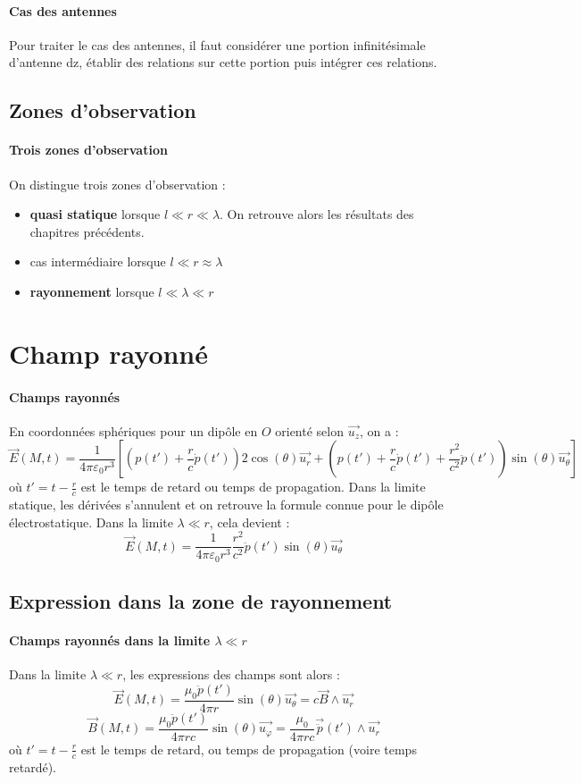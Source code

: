 \documentclass[french]{book}
\theoremstyle{plain}
\theoremstyle{definition}
\theoremstyle{remark}
\begin{document}
\paragraph{Cas des antennes} Pour traiter le cas des antennes, il faut considérer une portion infinitésimale d'antenne dz, établir des relations sur cette portion puis intégrer ces relations.
\subsection{Zones d'observation}
\paragraph{Trois zones d'observation} On distingue trois zones d'observation :
\begin{itemize}
	\item \textbf{quasi statique} lorsque $l\ll r\ll \lambda$. On retrouve alors les résultats des chapitres précédents.
	\item cas intermédiaire lorsque $l\ll r\approx\lambda$
	\item \textbf{rayonnement} lorsque $l\ll\lambda\ll r$
\end{itemize}
\section{Champ rayonné}
\paragraph{Champs rayonnés} En coordonnées sphériques pour un dipôle en $O$ orienté selon $\overrightarrow{u_z}$, on a : $$\overrightarrow{E}(M,t)=\frac{1}{4\pi\varepsilon_0 r^3}\left[\left(p(t')+\frac{r}{c}\dot{p}(t')\right)2\cos(\theta)\overrightarrow{u_r}+\left(p(t')+\frac{r}{c}\dot{p}(t')+\frac{r^2}{c^2}\ddot{p}(t')\right)\sin(\theta)\overrightarrow{u_\theta}\right]$$ où $t'=\displaystyle t-\frac{r}{c}$ est le temps de retard ou temps de propagation. Dans la limite statique, les dérivées s'annulent et on retrouve la formule connue pour le dipôle électrostatique. Dans la limite $\lambda\ll r$, cela devient : $$\overrightarrow{E}(M,t)=\frac{1}{4\pi\varepsilon_0 r^3}\frac{r^2}{c^2}\ddot{p}(t')\sin(\theta)\overrightarrow{u_\theta}$$
\subsection{Expression dans la zone de rayonnement}
\paragraph{Champs rayonnés dans la limite $\lambda\ll r$} Dans la limite $\lambda\ll r$, les expressions des champs sont alors : $$\overrightarrow{E}(M,t)=\frac{\mu_0\ddot{p}(t')}{4\pi r}\sin(\theta)\overrightarrow{u_\theta}=c\overrightarrow{B}\wedge\overrightarrow{u_r}$$ $$\overrightarrow{B}(M,t)=\frac{\mu_0\ddot{p}(t')}{4\pi rc}\sin(\theta)\overrightarrow{u_\varphi}=\frac{\mu_0}{4\pi rc}\overrightarrow{\ddot{p}}(t')\wedge\overrightarrow{u_r}$$ où $\displaystyle t'=t-\frac{r}{c}$ est le temps de retard, ou temps de propagation (voire temps retardé).
\end{document}
